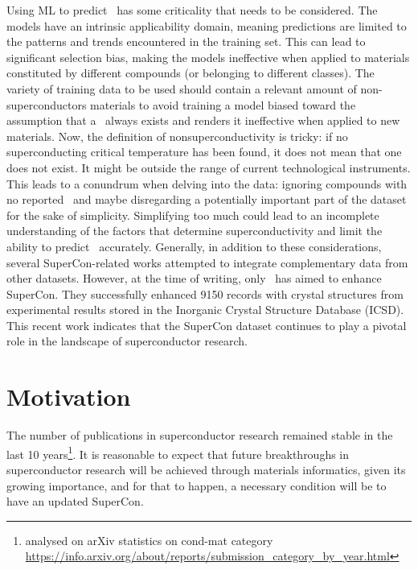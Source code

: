 Using ML to predict \tc~has some criticality that needs to be considered. 
The models have an intrinsic applicability domain, meaning predictions are limited to the patterns and trends encountered in the training set. 
This can lead to significant selection bias, making the models ineffective when applied to materials constituted by different compounds (or belonging to different classes). 
The variety of training data to be used should contain a relevant amount of non-superconductors materials to avoid training a model biased toward the assumption that a \tc~always exists and renders it ineffective when applied to new materials.
Now, the definition of nonsuperconductivity is tricky: if no superconducting critical temperature has been found, it does not mean that one does not exist. It might be outside the range of current technological instruments. 
This leads to a conundrum when delving into the data: ignoring compounds with no reported \tc~and maybe disregarding a potentially important part of the dataset for the sake of simplicity.
Simplifying too much could lead to an incomplete understanding of the factors that determine superconductivity and limit the ability to predict \tc~accurately. 
Generally, in addition to these considerations, several SuperCon-related works attempted to integrate complementary data from other datasets. 
However, at the time of writing, only~\cite{sommer20223dsc} has aimed to enhance SuperCon.  
They successfully enhanced 9150 records with crystal structures from experimental results stored in the Inorganic Crystal Structure Database (ICSD). 
This recent work indicates that the SuperCon dataset continues to play a pivotal role in the landscape of superconductor research.

\section{Motivation}

The number of publications in superconductor research remained stable in the last 10 years\footnote{analysed on arXiv statistics on cond-mat category \url{https://info.arxiv.org/about/reports/submission_category_by_year.html}}.
It is reasonable to expect that future breakthroughs in superconductor research will be achieved through materials informatics, given its growing importance, and for that to happen, a necessary condition will be to have an updated SuperCon. 

